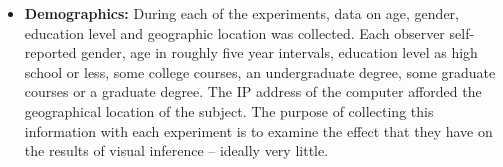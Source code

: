 \documentclass[10pt]{article}\usepackage[]{graphicx}\usepackage[]{xcolor}
\begin{document}
\begin{itemize}




\item{\bf Demographics:}  During each of the experiments, data on age, gender, education level and geographic location was collected. Each observer self-reported gender, age in roughly five year intervals, education level as high school or less, some college courses, an undergraduate degree, some graduate courses or a graduate degree. The IP address of the computer afforded the geographical location of the subject. The purpose of collecting this information with each experiment is to examine the effect that they have on the results of visual inference -- ideally very little. 


\end{itemize}
\end{document}

